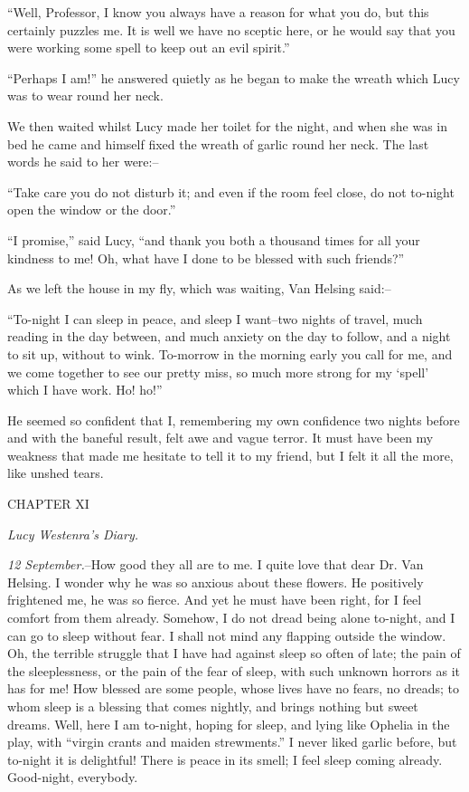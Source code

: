 \documentclass[12pt,openright]{book}
\begin{document}
“Well, Professor, I know you always have a reason for what you do, but this certainly puzzles me. It is well we have no sceptic here, or he would say that you were working some spell to keep out an evil spirit.”

“Perhaps I am!” he answered quietly as he began to make the wreath which Lucy was to wear round her neck.

We then waited whilst Lucy made her toilet for the night, and when she was in bed he came and himself fixed the wreath of garlic round her neck. The last words he said to her were:–

“Take care you do not disturb it; and even if the room feel close, do not to-night open the window or the door.”

“I promise,” said Lucy, “and thank you both a thousand times for all your kindness to me! Oh, what have I done to be blessed with such friends?”

As we left the house in my fly, which was waiting, Van Helsing said:–

“To-night I can sleep in peace, and sleep I want–two nights of travel, much reading in the day between, and much anxiety on the day to follow, and a night to sit up, without to wink. To-morrow in the morning early you call for me, and we come together to see our pretty miss, so much more strong for my ‘spell’ which I have work. Ho! ho!”

He seemed so confident that I, remembering my own confidence two nights before and with the baneful result, felt awe and vague terror. It must have been my weakness that made me hesitate to tell it to my friend, but I felt it all the more, like unshed tears.

CHAPTER XI

\textit{Lucy Westenra’s Diary.}

\textit{12 September.}–How good they all are to me. I quite love that dear Dr. Van Helsing. I wonder why he was so anxious about these flowers. He positively frightened me, he was so fierce. And yet he must have been right, for I feel comfort from them already. Somehow, I do not dread being alone to-night, and I can go to sleep without fear. I shall not mind any flapping outside the window. Oh, the terrible struggle that I have had against sleep so often of late; the pain of the sleeplessness, or the pain of the fear of sleep, with such unknown horrors as it has for me! How blessed are some people, whose lives have no fears, no dreads; to whom sleep is a blessing that comes nightly, and brings nothing but sweet dreams. Well, here I am to-night, hoping for sleep, and lying like Ophelia in the play, with “virgin crants and maiden strewments.” I never liked garlic before, but to-night it is delightful! There is peace in its smell; I feel sleep coming already. Good-night, everybody.
\end{document}
